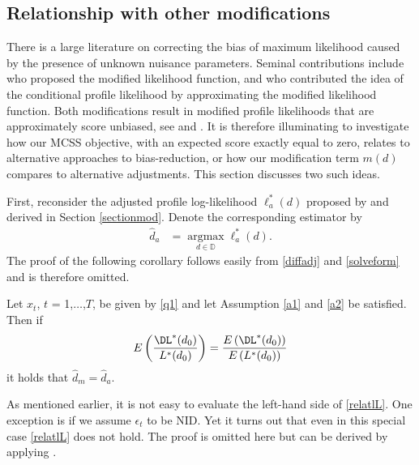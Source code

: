 {{\subsection{Relationship with other modifications} \label{relwother}

There is a large literature on correcting the bias of maximum likelihood caused by the presence of unknown nuisance parameters.  Seminal contributions include \textcite{barndorff1983formula} who proposed the modified likelihood
function, and \textcite{cox1987parameter} who contributed the idea of the conditional profile likelihood by approximating the modified likelihood function. Both modifications result in modified profile likelihoods that are
approximately score unbiased, see \textcite{liang1987estimating} and \textcite{cox1994inference}. It is therefore illuminating to investigate how our MCSS objective, with an expected score exactly equal to zero, relates to alternative approaches to bias-reduction, or how our modification term $m(d)$ compares to alternative adjustments. This
section discusses two such ideas.

First, reconsider the adjusted profile log-likelihood $\ell^*_a (d)$ proposed by \textcite{mccullagh1990simple} and derived in Section \ref{sectionmod}. Denote the corresponding estimator by
\begin{align*}
    \hat{d}_{a} &= \operatorname*{argmax}_{d \in \mathbb{D}}  \ell^*_{a}(d).
\end{align*}
The proof of the following corollary follows easily from \eqref{diffadj} and \eqref{solveform} and is therefore omitted.
\begin{corollary} \label{corrrelationship}
  Let $x_t$, $t$ = 1,$\ldots$,$T$, be given by \eqref{q1} and let Assumption \ref{a1} and \ref{a2} be satisfied. Then if
  \begin{align} 
    E \left( \frac{ \DL^*(d_0) }{L^*(d_0) } \right) =  \frac{E \left( \DL^*(d_0) \right)}{E \left( L^*(d_0)  \right)} \label{relatlL}  
  \end{align}
  it holds that $\hat{d}_{m} = \hat{d}_{a}$.  
  \end{corollary}


As mentioned earlier, it is not easy to evaluate the left-hand side of \eqref{relatlL}. One exception is if we assume $\epsilon_t$ to be NID. Yet it turns out that even in this special case \eqref{relatlL} does not hold. The proof is omitted here but can be derived by applying \textcite[Lemma S.7.1]{martellosio2020adjusted}. 

}}
